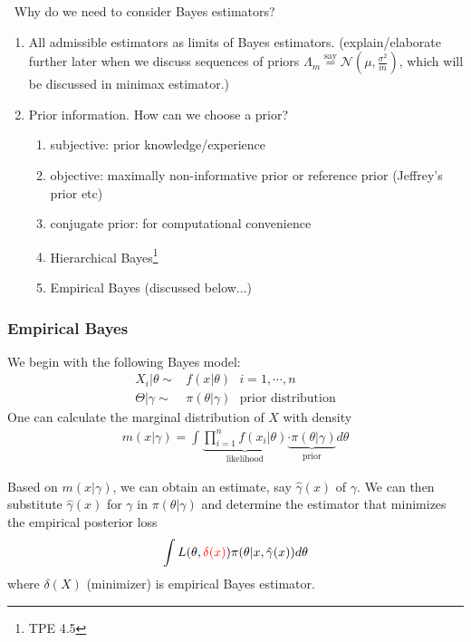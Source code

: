 $~$
Why do we need to consider Bayes estimators?
\begin{enumerate}
    \item All admissible estimators as limits of Bayes estimators.
    (explain/elaborate further later 
    when we discuss sequences of priors $\Lambda_m\overset{\text{say}}{=}\mathcal{N}(\mu,\frac{\sigma^2}{m})$,
    which will be discussed in minimax estimator.)
    \item Prior information. How can we choose a prior?
    \begin{enumerate}[{(a)}]
        \item subjective: prior knowledge/experience
        \item objective: maximally non-informative prior or reference prior (Jeffrey's prior etc)
        \item conjugate prior: for computational convenience
        \item Hierarchical Bayes\footnote{TPE 4.5}
        \item Empirical Bayes (discussed below...)
    \end{enumerate}
\end{enumerate}

\subsubsection{Empirical Bayes}

We begin with the following Bayes model:
\begin{align}
    X_i|\theta\sim&f(x|\theta)~~~i=1,\cdots,n\\
    \Theta|\gamma\sim&\pi(\theta|\gamma)~~~\text{prior distribution}
\end{align}
One can calculate the marginal distribution of $X$ with density
\begin{gather}
    m(x|\gamma)=\int{
        \underbrace{\prod_{i=1}^n{f(x_i|\theta)}}_{\text{likelihood}}
        \underbrace{\cdot\pi(\theta|\gamma)}_{\text{prior}}
    }d\theta
\end{gather}

Based on $m(x|\gamma)$, we can obtain an estimate, say $\hat{\gamma}(x)$ of $\gamma$.
We can then substitute $\hat{\gamma}(x)$ for $\gamma$ in $\pi(\theta|\gamma)$ 
and determine the estimator that minimizes the empirical posterior loss
\begin{gather}
    \int{
        L(\theta,{\color{red}\delta(x)})\pi(\theta|x,\hat{\gamma}(x))
    }d\theta
\end{gather}
where $\delta(X)$ (minimizer) is empirical Bayes estimator.

